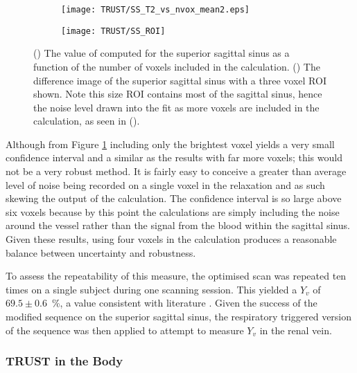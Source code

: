 \begin{figure}[H]
	\centering
	\begin{subfigure}[c]{0.47\textwidth}
		\centering
		\texttt{[image: TRUST/SS\_T2\_vs\_nvox\_mean2.eps]}
		\caption{}
		\label{fig:nvox_SS}
	\end{subfigure}
	\hfill
	\begin{subfigure}[c]{0.47\textwidth}
		\centering
		\texttt{[image: TRUST/SS\_ROI]}
		\caption{}
		\label{fig:SS_ROI}
	\end{subfigure}
	\caption{() The value of \ttwo computed for the superior sagittal sinus as a function of the number of voxels included in the calculation. () The difference image of the superior sagittal sinus with a three voxel \ac{ROI} shown. Note this size \ac{ROI} contains most of the sagittal sinus, hence the noise level drawn into the fit as more voxels are included in the calculation, as seen in ().}
	\label{fig:nv_SS}
\end{figure}

\newpage
Although from Figure \ref{fig:nvox_SS} including only the brightest voxel yields a very small confidence interval and a similar \ttwo as the results with far more voxels; this would not be a very robust method. It is fairly easy to conceive a greater than average level of noise being recorded on a single voxel in the relaxation and as such skewing the output of the calculation. The confidence interval is so large above six voxels because by this point the calculations are simply including the noise around the vessel rather than the signal from the blood within the sagittal sinus. Given these results, using four voxels in the calculation produces a reasonable balance between uncertainty and robustness.

To assess the repeatability of this measure, the optimised scan was repeated ten times on a single subject during one scanning session. This yielded a $Y_v$ of $69.5\pm0.6$~\%, a value consistent with literature \cite{nagdyman_comparison_2005, liu_multi-site_2016}. Given the success of the modified sequence on the superior sagittal sinus, the respiratory triggered version of the sequence was then applied to attempt to measure $Y_v$ in the renal vein.

\subsubsection{\ac{TRUST} in the Body}

